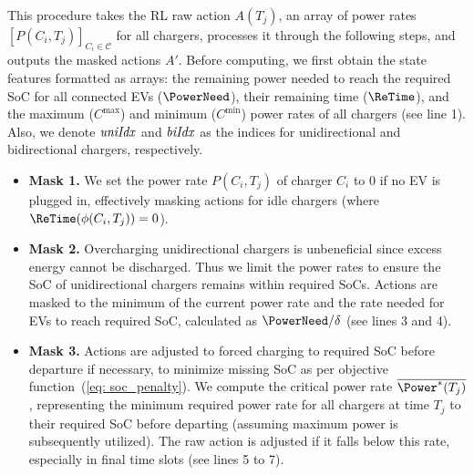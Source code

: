 This procedure takes the RL raw action $A(T_j)$, an array of power rates $[P(C_i, T_j)]_{C_i\in\mathcal{C}}$ for all chargers, processes it through the following steps, and outputs the masked actions $A'$. Before computing, we first obtain the state features formatted as arrays: the remaining power needed to reach the required SoC for all connected EVs ($\PowerNeed$), their remaining time ($\ReTime$), and the maximum ($C^{\max}$) and minimum ($C^{\min}$) power rates of all chargers (see line 1). Also, we denote ${\it uniIdx}$ and ${\it biIdx}$ as the indices for unidirectional and bidirectional chargers, respectively.    
\begin{itemize}[leftmargin=*]
    \item \textbf{Mask 1.} 
    We set the power rate $P(C_i, T_j)$ of charger $C_i$ to 0 if no EV is plugged in, effectively masking actions for idle chargers (where $\ReTime(\phi(C_i, T_j))=0$).
    \item \textbf{Mask 2.} Overcharging unidirectional chargers is unbeneficial since excess energy cannot be discharged. Thus we limit the power rates to ensure the SoC of unidirectional chargers remains within required SoCs. 
    Actions are masked to the minimum of the current power rate and the rate needed for EVs to reach required SoC, calculated as $\PowerNeed/\delta$ (see lines 3 and 4).
    \item \textbf{Mask 3.} 
    Actions are adjusted to forced charging to required SoC before departure if necessary, to minimize missing SoC as per objective function~(\ref{eq: soc_penalty}).  
    We compute the critical power rate $\overline{\Power^*(T_j)}$, representing the minimum required power rate for all chargers at time $T_j$ to their required SoC before departing (assuming maximum power is subsequently utilized). The raw action is adjusted if it falls below this rate, especially in final time slots (see lines 5 to 7).
    

\end{itemize}
